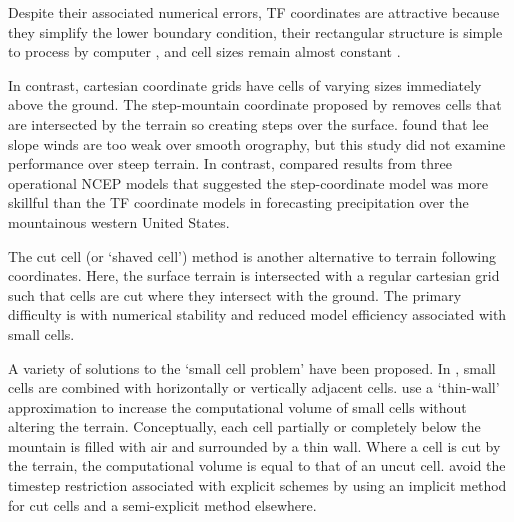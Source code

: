 
Despite their associated numerical errors, TF coordinates are attractive because they simplify the lower boundary condition, their rectangular structure is simple to process by computer \autocite{schaer2002}, and cell sizes remain almost constant \autocite{jebens2011}.

In contrast, cartesian coordinate grids have cells of varying sizes immediately above the ground.  The step-mountain coordinate proposed by \textcite{mesinger1988} removes cells that are intersected by the terrain so creating steps over the surface.    \textcite{gallus-klemp2000} found that lee slope winds are too weak over smooth orography, but this study did not examine performance over steep terrain.  In contrast, \textcite{mesinger2004} compared results from three operational NCEP models that suggested the step-coordinate model was more skillful than the TF coordinate models in forecasting precipitation over the mountainous western United States.


The cut cell (or `shaved cell')  method is another alternative to terrain following coordinates.  Here, the surface terrain is intersected with a regular cartesian grid such that cells are cut where they intersect with the ground.   The primary difficulty is with numerical stability and reduced model efficiency associated with small cells. 

A variety of solutions to the `small cell problem' have been proposed.  In \textcite{yamazaki-satomura2010}, small cells are combined with horizontally or vertically adjacent cells.     \textcite{steppeler2002} use a `thin-wall' approximation to increase the computational volume of small cells without altering the terrain.  Conceptually, each cell partially or completely below the mountain is filled with air and surrounded by a thin wall.  Where a cell is cut by the terrain, the computational volume is equal to that of an uncut cell.  \textcite{jebens2011} avoid the timestep restriction associated with explicit schemes by using an implicit method for cut cells and a semi-explicit method elsewhere.

